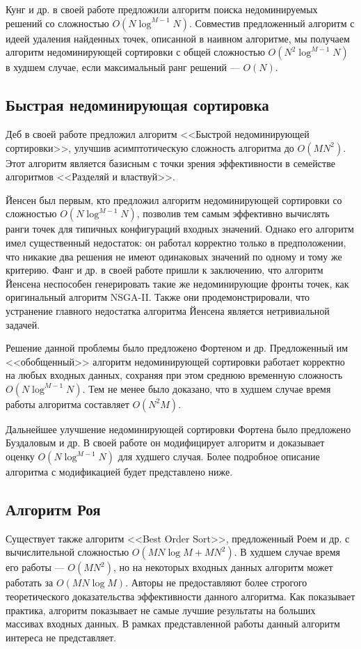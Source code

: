 Кунг и др. в своей работе предложили алгоритм поиска недоминируемых решений со сложностью $O(N\log^{M-1}N)$. Совместив предложенный алгоритм с идеей удаления найденных точек, описанной в наивном алгоритме, мы получаем алгоритм недоминирующей сортировки с общей сложностью $O(N^2\log^{M-1}N)$ в худшем случае, если максимальный ранг решений --- $O(N)$.

\subsection{Быстрая недоминирующая сортировка}
Деб в своей работе предложил алгоритм <<Быстрой недоминирующей сортировки>>, улучшив асимптотическую сложность алгоритма до $O(MN^2)$. Этот алгоритм является базисным с точки зрения эффективности в семействе алгоритмов <<Разделяй и властвуй>>.

Йенсен был первым, кто предложил алгоритм недоминирующей сортировки со сложностью $O(N\log^{M-1}N)$, позволив тем самым эффективно вычислять ранги точек для типичных конфигураций входных значений. Однако его алгоритм имел существенный недостаток: он работал корректно только в предположении, что никакие два решения не имеют одинаковых значений по одному и тому же критерию. Фанг и др. в своей работе пришли к заключению, что алгоритм Йенсена неспособен генерировать такие же недоминирующие фронты точек, как оригинальный алгоритм NSGA-II. Также они продемонстрировали, что устранение главного недостатка алгоритма Йенсена является нетривиальной задачей.

Решение данной проблемы было предложено Фортеном и др. Предложенный им <<обобщенный>> алгоритм недоминирующей сортировки работает корректно на любых входных данных, сохраняя при этом среднюю временную сложность $O(N\log^{M-1}N)$. Тем не менее было доказано, что в худшем случае время работы алгоритма составляет $O(N^2M)$.

Дальнейшее улучшение недоминирующей сортировки Фортена было предложено Буздаловым и др. В своей работе он модифицирует алгоритм и доказывает оценку $O(N\log^{M-1}N)$ для худшего случая. Более подробное описание алгоритма с модификацией будет представлено ниже.

\subsection{Алгоритм Роя}
Существует также алгоритм <<Best Order Sort>>, предложенный Роем и др. с вычислительной сложностью $O(MN\log{M}+MN^2)$. В худшем случае время его работы --- $O(MN^2)$, но на некоторых входных данных алгоритм может работать за $O(MN\log{M})$. Авторы не предоставляют более строгого теоретического доказательства эффективности данного алгоритма. Как показывает практика, алгоритм показывает не самые лучшие результаты на больших массивах входных данных. В рамках представленной работы данный алгоритм интереса не представляет.

